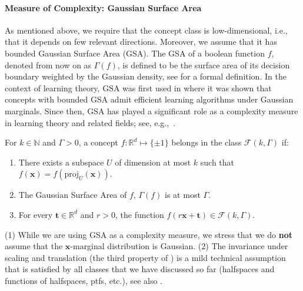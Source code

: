 \documentclass{theoretics}
\renewcommand\vec[1]{\mathbf{#1}}
\newcommand{\proj}{\mathrm{proj}}
\newcommand{\R}{\mathbb{R}}
\newcommand{\1}{\Ind}
\newcommand{\x}{\vec x}
\begin{document}
\paragraph{Measure of Complexity: Gaussian Surface Area}
As mentioned above, we require that the concept class is low-dimensional, i.e., that it depends on few relevant directions.  Moreover, we assume that it has bounded Gaussian Surface Area (GSA).  The GSA of a boolean function $f$, denoted from now on as $\Gamma(f)$, 
is defined to be the surface area of its decision boundary weighted by the Gaussian density, see  for a formal definition. In the context of learning theory, GSA was first used in \cite{KOS:08}  where it was shown that concepts with bounded GSA admit efficient learning algorithms under Gaussian marginals. Since then, GSA has played a significant role as a complexity measure in learning theory and related fields; see, e.g.,~\cite{Kane11, Neeman14, KTZ19, DeMN21}.  
\begin{definition}
\label{def:bounded-surface-area-concepts}
For $k \in \mathbb N$ and $\Gamma > 0$,  a concept $f:\R^d \mapsto \{\pm 1\}$ belongs in the class $\mathcal{F}(k, \Gamma)$ if:
\begin{enumerate}
\item There exists a subspace $U$ of dimension at most $k$ such that $f(\x) = f(\proj_U(\x))$.
\item The Gaussian Surface Area of $f$, $\Gamma(f)$ is at most $\Gamma$.
\item For every $\vec t \in \R^d$ and $r>0$, the function $f(r \x + \vec t) \in \mathcal F(k, \Gamma)$.
\end{enumerate}

\end{definition}
\begin{remark}
(1) While we are using GSA as a complexity measure, we stress that we do {\bf not} assume that the $\x$-marginal distribution is Gaussian.  
(2) The invariance under scaling and translation (the third property of ) is a mild technical assumption that is satisfied by all classes that we have discussed so far (halfspaces and functions of halfspaces, ptfs, etc.), see also .
\end{remark}
\end{document}
